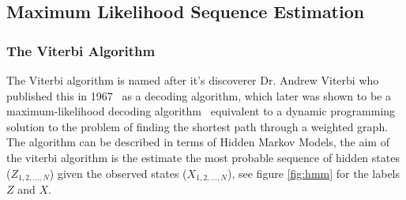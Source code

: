 \documentclass[10pt,journal,compsoc]{IEEEtran} %
\begin{document}
  \subsection{Maximum Likelihood Sequence Estimation}
  \subsubsection{The Viterbi Algorithm}
  The Viterbi algorithm is named after it's discoverer Dr. Andrew Viterbi who published this in 1967~\cite{vit67} as a decoding algorithm, which later was shown to be a maximum-likelihood decoding algorithm~\cite{For73} equivalent to a dynamic programming solution to the problem of finding the shortest path through a weighted graph. The algorithm can be described in terms of Hidden Markov Models, the aim of the viterbi algorithm is the estimate the most probable sequence of hidden states ($Z_{1,2,...,N}$) given the observed states ($X_{1,2,...,N}$), see figure \ref{fig:hmm} for the labels $Z$ and $X$. 




\end{document}
